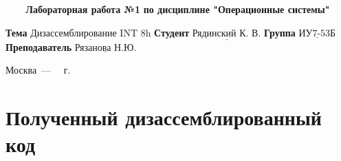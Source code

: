 \documentclass[a4paper,12pt]{article}
\begin{document}
\begin{center}
	\noindent\begin{minipage}{1.3\textwidth}\centering
	\Large\textbf{   ~~~ Лабораторная работа №1}\newline
	\textbf{по дисциплине "Операционные системы"}\newline\newline\newline
	\end{minipage}
\end{center}

\noindent\textbf{Тема} $\underline{\text{Дизассемблирование INT 8h}}$\newline\newline
\noindent\textbf{Студент} $\underline{\text{Рядинский К. В.}}$\newline\newline
\noindent\textbf{Группа} $\underline{\text{ИУ7-53Б}}$\newline\newline
\noindent\textbf{Преподаватель} $\underline{\text{Рязанова Н.Ю.}}$\newline

\begin{center}
	\vfill
	Москва~---~\the\year
~г.
\end{center}
\clearpage

\section{Полученный дизассемблированный код}
\end{document}
